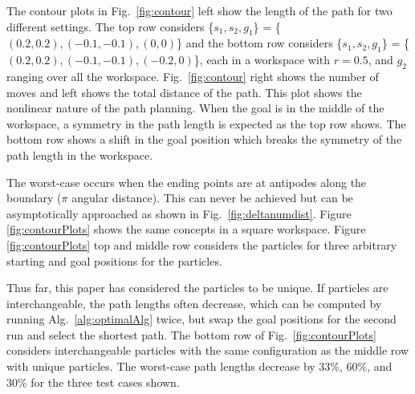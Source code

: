  The contour plots in Fig.~\ref{fig:contour} left show the length of the path for two different settings. The top row considers \{$s_1,s_2,g_1$\} = \{$(0.2,0.2),(-0.1,-0.1),(0,0)$\} and the bottom row considers  \{$s_1,s_2,g_1$\} = \{$(0.2,0.2),(-0.1,-0.1),(-0.2,0)$\}, each in a workspace with $r= 0.5$, and $g_2$ ranging over all the workspace. Fig.~\ref{fig:contour} right shows the number of moves and left shows the total distance of the path. This plot shows the nonlinear nature of the path planning. When the goal is in the middle of the workspace, a symmetry in the path length is expected as the top row shows. The bottom row shows a shift in the goal position which breaks the symmetry of the path length in the workspace.
 
 The worst-case occurs when the ending points are at antipodes along the boundary ($\pi$ angular distance). This can never be achieved but can be asymptotically approached as shown in Fig.~\ref{fig:deltanumdist}. 
 Figure \ref{fig:contourPlots} shows the same concepts in a square workspace. Figure \ref{fig:contourPlots} top and middle row considers the particles for three arbitrary starting and goal positions for the particles. 

 Thus far, this paper has considered the particles to be unique. If particles are interchangeable, the path lengths often decrease, which can be computed by running Alg.~\ref{alg:optimalAlg} twice,  but swap the goal positions for the second run and select the shortest path.  The bottom row of  Fig.~\ref{fig:contourPlots} considers interchangeable particles with the same configuration as the middle row with unique particles. The worst-case path lengths decrease by 33\%, 60\%, and 30\% for the three test cases shown. %
 
 










